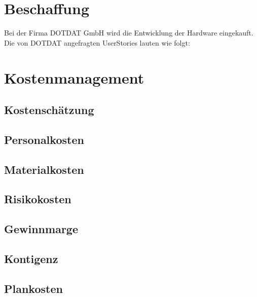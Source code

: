 \section{Beschaffung} %
Bei der Firma DOTDAT GmbH wird die Entwicklung der Hardware eingekauft. Die von DOTDAT angefragten UserStories lauten wie folgt:





% 




\section{Kostenmanagement}



\subsection{Kostenschätzung}
\lipsum[2]
\subsection{Personalkosten} %
\lipsum[2]
\subsection{Materialkosten}
\lipsum[2]
\subsection{Risikokosten}
\lipsum[2]
\subsection{Gewinnmarge}
\lipsum[2]
\subsection{Kontigenz} %
\lipsum[2]
\subsection{Plankosten}
\lipsum[2]





